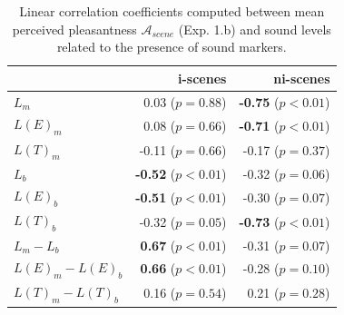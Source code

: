 \documentclass[12pt]{elsarticle}
\begin{document}
\begin{table}[t]
\setlength{\tabcolsep}{3pt}
\centering
{\renewcommand{\arraystretch}{1}
\centering
\begin{tabular}{l r r}
                  &   i-scenes                  & ni-scenes \\
\hline
$L_m$              & 0.03  ($p=0.88$)           & \textbf{-0.75} ($p<0.01$) \\
$L(E)_m$           & 0.08  ($p=0.66$)           & \textbf{-0.71} ($p<0.01$) \\
$L(T)_m$           & -0.11 ($p=0.66$)           & -0.17 ($p=0.37$) \\
$L_b$              & \textbf{-0.52} ($p<0.01$)  & -0.32 ($p=0.06$) \\
$L(E)_b$           & \textbf{-0.51} ($p<0.01$)  & -0.30 ($p=0.07$) \\
$L(T)_b$           & -0.32 ($p=0.05$)           & \textbf{-0.73} ($p<0.01$) \\
$L_m-L_b$          & \textbf{0.67} ($p<0.01$)   & -0.31 ($p=0.07$) \\
$L(E)_m-L(E)_b$    & \textbf{0.66} ($p<0.01$)   & -0.28 ($p=0.10$) \\
$L(T)_m-L(T)_b$    & 0.16 ($p=0.54$)            & 0.21 ($p=0.28$) \\
\hline
\end{tabular}
}
\vspace{0.5mm}
\caption{Linear correlation coefficients computed between mean perceived pleasantness $\mathcal{A}_{scene}$ (Exp. 1.b) and sound levels related to the presence of sound markers.}
\label{tab:corrMarkers}
\end{table}
\end{document}
